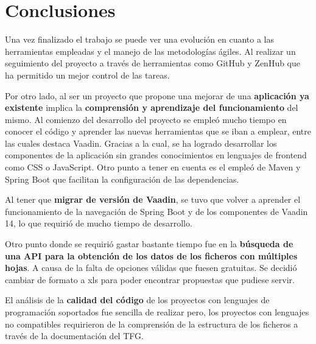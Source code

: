 
\section{Conclusiones}
Una vez finalizado el trabajo se puede ver una evolución en cuanto a las herramientas empleadas y el manejo de las metodologías ágiles. Al realizar un seguimiento del proyecto a través de herramientas como GitHub y ZenHub que ha permitido un mejor control de las tareas.

Por otro lado, al ser un proyecto que propone una mejorar de una \textbf{aplicación ya existente} implica la \textbf{comprensión y aprendizaje del funcionamiento} del mismo. Al comienzo del desarrollo del proyecto se empleó mucho tiempo en conocer el código y aprender las nuevas herramientas que se iban a emplear, entre las cuales destaca Vaadin. Gracias a la cual, se ha logrado desarrollar los componentes de la aplicación sin grandes conocimientos en lenguajes de frontend como CSS o JavaScript. 
Otro punto a tener en cuenta es el empleó de Maven y Spring Boot que facilitan la configuración de las dependencias.

Al tener que \textbf{migrar de versión de Vaadin}, se tuvo que volver a aprender el funcionamiento de la navegación de Spring Boot y de los componentes de Vaadin 14, lo que requirió de mucho tiempo de desarrollo.

Otro punto donde se requirió gastar bastante tiempo fue en la \textbf{búsqueda de una API para la obtención de los datos de los ficheros con múltiples hojas}. A causa de la falta de opciones válidas que fuesen gratuitas. Se decidió cambiar de formato a xls para poder encontrar propuestas que pudiese servir.

El análisis de la \textbf{calidad del código} de los proyectos con lenguajes de programación soportados fue sencilla de realizar pero, los proyectos con lenguajes no compatibles requirieron de la comprensión de la estructura de los ficheros a través de la documentación del TFG. 

